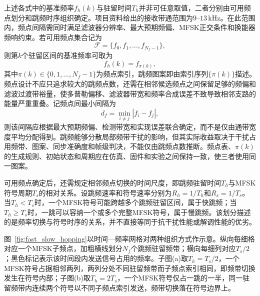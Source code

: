 上述各式中的基准频率$f_h(k)$与驻留时间$T_h$并非可任意取值，二者分别由可用频点划分和跳频时序组织确定。项目资料给出的接收带通范围为$9$--$13\,\mathrm{kHz}$。在此范围内，频点间隔需同时满足滤波器分辨率、最大预期频偏、MFSK正交条件和换能器频响约束。若可用频点集合记为
\[
\mathcal{F}=\{f_0,f_1,\ldots,f_{N_f-1}\},
\]
则第$k$个驻留区间的基准频率可取为
\[
 f_h(k)=f_{\pi(k)},
\]
其中$\pi(k)\in\{0,1,\ldots,N_f-1\}$为频点索引，跳频图案即由索引序列$\{\pi(k)\}$描述。频点设计不应只追求较大的跳频点数，还需在相邻候选频点之间保留足够的频偏和滤波过渡带裕量，使多普勒偏移、滤波器带宽和频率合成误差不致导致相邻支路的能量严重重叠。记频点间最小间隔为
\begin{equation}
 d_f=\min_{i\ne j}|f_i-f_j|,
\label{eq:chap03_min_frequency_spacing}
\end{equation}
则该间隔应根据最大预期频偏、检测带宽和实现误差联合确定，而不是仅由通带宽度平均分配得到。跳频能够分散局部频带干扰的影响，但其实际收益取决于干扰占用频带、图案、同步准确度和帧级判决，不能仅由跳频点数推断。频点表、$\pi(k)$的生成规则、初始状态和周期应在仿真、固件和实验之间保持一致，使三者使用同一图案。

可用频点确定后，还需规定相邻频点切换的时间尺度，即跳频驻留时间$T_h$与MFSK符号周期$T_s$的相对关系。设跳频速率和符号速率分别为$R_h=1/T_h$和$R_s=1/T_s$。当$T_h<T_s$时，一个MFSK符号可能跨越多个跳频驻留区间，属于快跳频；当$T_h\geq T_s$时，一跳可以容纳一个或多个完整MFSK符号，属于慢跳频。该划分描述的是频率切换与符号时序的关系，并不直接等同于抗干扰性能或解调性能的优劣。

图~\ref{fig:fast_slow_hopping}以时间—频率网格对两种组织方式作示意。纵向每细格对应一个MFSK子频点，加粗横线划分$N_f$个跳频驻留频带；横向每细列对应$T_s/2$；黑色标记表示该时间段内发送信号占用的频率。子图(a)取$T_h=T_s/2$，一个MFSK符号占据相邻两列，两列分处不同驻留频带而子频点索引相同，即频带切换发生在符号内部；子图(b)取$T_h=2T_s$，一个MFSK符号仅占一跳的一半，同一驻留频带内连续两个符号以不同子频点索引发送，频带切换落在符号边界上。


